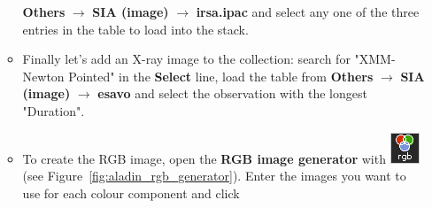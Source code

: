 \documentclass [a4paper, 12pt]{article}
\begin{document}
\begin{itemize}
\begin{itemize}
         \textbf{Others} $\rightarrow$ \textbf{SIA (image)} $\rightarrow$ 
         \textbf{irsa.ipac} and select any one of the three entries in the 
         table to load into the stack.
         \item Finally let's add an X-ray image to the collection: search for 
         "XMM-Newton Pointed" in the \textbf{Select} line, load the table from 
         \textbf{Others} $\rightarrow$ \textbf{SIA (image)} $\rightarrow$ 
         \textbf{esavo} and select the observation with the longest "Duration".
         \item To create the RGB image, open the \textbf{RGB image generator} 
         with \includegraphics[width=0.04  
         \textwidth]{../images/aladin_button_rgb.png} (see 
         Figure~\ref{fig:aladin_rgb_generator}). Enter the images you want to 
         use for each colour component and click
     \end{itemize}


\end{itemize}
\end{document}
